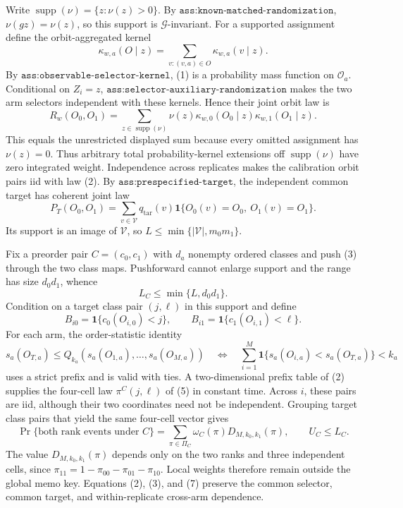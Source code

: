 Write \(\operatorname{supp}(\nu)=\{z:\nu(z)>0\}\). By \(\texttt{ass:known-matched-randomization}\), \(\nu(gz)=\nu(z)\), so this support is \(\mathcal G\)-invariant. For a supported assignment define the orbit-aggregated kernel
\[
\kappa_{w,a}(O\mid z)=\sum_{v:(v,a)\in O}\kappa_{w,a}(v\mid z).
\tag{1}
\]
By \(\texttt{ass:observable-selector-kernel}\), (1) is a probability mass function on \(\mathcal O_a\). Conditional on \(Z_i=z\), \(\texttt{ass:selector-auxiliary-randomization}\) makes the two arm selectors independent with these kernels. Hence their joint orbit law is
\[
R_w(O_0,O_1)=\sum_{z\in\operatorname{supp}(\nu)}\nu(z)\kappa_{w,0}(O_0\mid z)\kappa_{w,1}(O_1\mid z).
\tag{2}
\]
This equals the unrestricted displayed sum because every omitted assignment has \(\nu(z)=0\). Thus arbitrary total probability-kernel extensions off \(\operatorname{supp}(\nu)\) have zero integrated weight. Independence across replicates makes the calibration orbit pairs iid with law (2). By \(\texttt{ass:prespecified-target}\), the independent common target has coherent joint law
\[
P_T(O_0,O_1)=\sum_{v\in\mathcal V}q_{\mathrm{tar}}(v)\mathbf 1\{O_0(v)=O_0,\ O_1(v)=O_1\}.
\tag{3}
\]
Its support is an image of \(\mathcal V\), so \(L\le\min\{|\mathcal V|,m_0m_1\}\).

Fix a preorder pair \(C=(c_0,c_1)\) with \(d_a\) nonempty ordered classes and push (3) through the two class maps. Pushforward cannot enlarge support and the range has size \(d_0d_1\), whence
\[
L_C\le\min\{L,d_0d_1\}.
\tag{4}
\]
Condition on a target class pair \((j,\ell)\) in this support and define
\[
B_{i0}=\mathbf 1\{c_0(O_{i,0})<j\},\qquad B_{i1}=\mathbf 1\{c_1(O_{i,1})<\ell\}.
\tag{5}
\]
For each arm, the order-statistic identity
\[
s_a(O_{T,a})\le Q_{k_a}(s_a(O_{1,a}),\ldots,s_a(O_{M,a}))
\quad\Longleftrightarrow\quad
\sum_{i=1}^M\mathbf 1\{s_a(O_{i,a})<s_a(O_{T,a})\}<k_a
\tag{6}
\]
uses a strict prefix and is valid with ties. A two-dimensional prefix table of (2) supplies the four-cell law \(\pi^C(j,\ell)\) of (5) in constant time. Across \(i\), these pairs are iid, although their two coordinates need not be independent. Grouping target class pairs that yield the same four-cell vector gives
\[
\Pr\{\text{both rank events under }C\}=\sum_{\pi\in\Pi_C}\omega_C(\pi)D_{M,k_0,k_1}(\pi),\qquad U_C\le L_C.
\tag{7}
\]
The value \(D_{M,k_0,k_1}(\pi)\) depends only on the two ranks and three independent cells, since \(\pi_{11}=1-\pi_{00}-\pi_{01}-\pi_{10}\). Local weights therefore remain outside the global memo key. Equations (2), (3), and (7) preserve the common selector, common target, and within-replicate cross-arm dependence.

